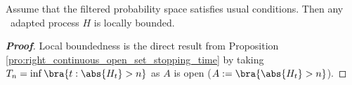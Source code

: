 \begin{proposition}\label{pro:right_continuous_adapted_process_is_locally_bounded_usual_conditions}
Assume that the filtered probability space satisfies usual conditions. Then any \cadlag\ adapted process $H$ is locally bounded.
\end{proposition}

\begin{proof}[\bf Proof]
Local boundedness is the direct result from Proposition \ref{pro:right_continuous_open_set_stopping_time} by taking $T_n = \inf\bra{t:\abs{H_t} > n}$ as $A$ is open ($A := \bra{\abs{H_t} > n}$).
\end{proof}







